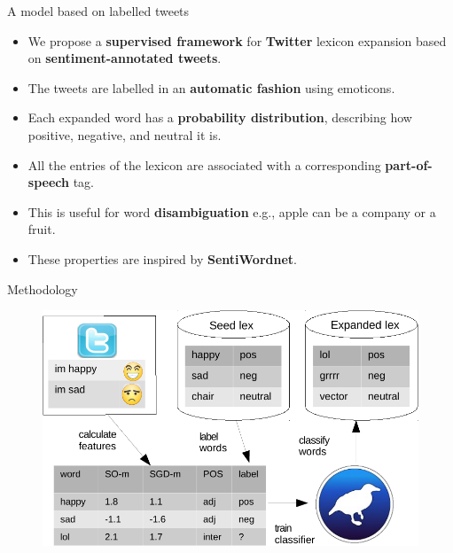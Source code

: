 \documentclass[handout]{beamer}
\begin{document}
\begin{frame}{A model based on labelled tweets}
\begin{scriptsize}
\begin{itemize}
\item We propose a \textbf{supervised framework} for \textbf{Twitter} lexicon expansion based on \textbf{sentiment-annotated tweets}.
\item The tweets are labelled in an \textbf{automatic fashion} using emoticons. 
\item Each expanded word has a \textbf{probability distribution}, describing how positive, negative, and neutral it is.
\item All the entries of the lexicon are associated with a corresponding \textbf{part-of-speech} tag.
\item This is useful for word \textbf{disambiguation} e.g., apple can be a company or a fruit.
\item These properties are inspired by \textbf{SentiWordnet}.
\end{itemize}
\end{scriptsize}

\end{frame}


\begin{frame}{Methodology}
\begin{figure}[htb]
	\centering
	 \includegraphics[scale=0.8]{diagram_crop.pdf}
	\label{fig:sosgd}
\end{figure}
\end{frame}
\end{document}
